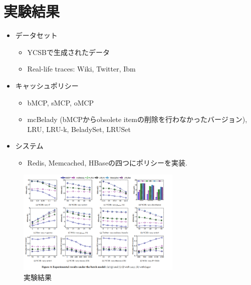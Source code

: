 \documentclass[dvipdfmx,uplatex]{jsarticle}
\theoremstyle{remark}
\newenvironment{experiment}[1]{
    \begin{tcolorbox}[
        colframe=violet,
        colback=violet!10!white,
        colbacktitle=violet!40!white,
        coltitle=black,
        fonttitle=\bfseries,
        title={#1}
    ]
}{
    \end{tcolorbox}
}
\begin{document}
\section{実験結果}
\begin{experiment}{実験手法}
\begin{itemize}
    \item データセット
    \begin{itemize}
        \item YCSBで生成されたデータ
        \item Real-life traces: Wiki, Twitter, Ibm
    \end{itemize}
    \item キャッシュポリシー
    \begin{itemize}
        \item bMCP, sMCP, oMCP
        \item mcBelady (bMCPからobsolete itemの削除を行わなかったバージョン), LRU, LRU-k, BeladySet, LRUSet
    \end{itemize}
    \item システム
    \begin{itemize}
        \item Redis, Memcached, HBaseの四つにポリシーを実装.
    \end{itemize}
\end{itemize}
\end{experiment}

\begin{figure}
    \centering
    \includegraphics[width=0.7\textwidth]{img/cache-consistent/experiment-result.png}
    \caption{実験結果}
    \label{fig:experiment-result}
\end{figure}
\end{document}
